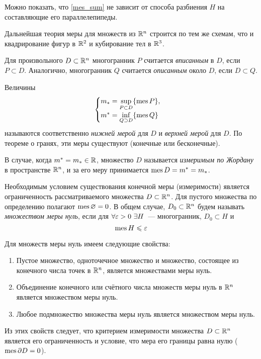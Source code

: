 \documentclass[../../main.tex]{subfiles}
\begin{document}
Можно показать, что \eqref{mes_sum} не зависит от способа разбиения $H$ 
на составляющие его параллелепипеды.

Дальнейшая теория меры для множеств из $\mathbb{R}^n$ строится по тем же
схемам, что и квадрирование фигур в $\mathbb{R}^2$ и кубирование тел в $\mathbb{R}^3$.

Для произвольного $D \subset \mathbb{R}^n$ многогранник $P$ 
считается \emph{вписанным} в $D$, 
если $P \subset D$. Аналогично, многогранник $Q$ 
считается \emph{описанным} около $D$, если $D \subset Q$.

Величины
\begin{equation}
\begin{cases}
m_* = \underset{P \subset D}{\sup} \{ \operatorname{mes} P \}, \\
m^* = \underset{Q \supset D}{\inf} \{ \operatorname{mes} Q \}
\end{cases}
\end{equation}
называются соответственно \emph{нижней мерой} для $D$ и 
\emph{верхней мерой} для $D$.
По теореме о гранях, эти меры существуют (конечные или бесконечные).

В случае, когда $ m^* = m_* \in \mathbb{R}$,
множество $D$ называется \emph{измеримым по Жордану} в пространстве $\mathbb{R}^n$,
и за его меру принимается $\operatorname{mes} D = m^* = m_*$.

Необходимым условием существования конечной меры (измеримости) 
является ограниченность рассматриваемого множества $D \subset \mathbb{R}^n$. 
Для пустого множества по определению полагают $\operatorname{mes}\varnothing = 0$.
В общем случае, $D_0 \subset \mathbb{R}^n$ будем называть \emph{множеством меры нуль}, 
если для $\forall \varepsilon > 0\ \exists H$~--- многогранник, $D_0\subset H$ и
\begin{equation}
\label{614}
\operatorname{mes} H\leqslant\varepsilon
\end{equation}

Для множеств меры нуль имеем следующие свойства:
\begin{enumerate}
	\item Пустое множество, одноточечное множество и множество, 
	состоящее из конечного числа точек в $\mathbb{R}^n$, является множествами меры нуль.
	\item Объединение конечного или счётного числа множеств меры нуль 
	в $\mathbb{R}^n$ является множеством меры нуль.
	\item Любое подмножество множества меры нуль является множеством меры нуль.
\end{enumerate}

Из этих свойств следует, что критерием измеримости множества $D \subset \mathbb{R}^n$ 
является его ограниченность и условие, что мера его границы равна нулю
 ($ \operatorname{mes}\partial D = 0 $).
\end{document}
